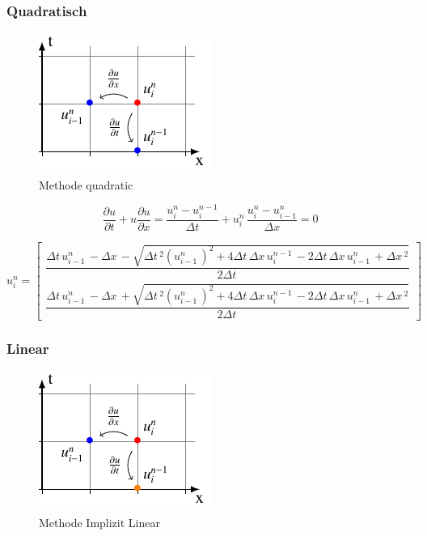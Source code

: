 \subsubsection{Quadratisch}
     \begin{figure}[!ht]
	\centering
	\includegraphics[height=.4\textwidth]{papers/burgers/BurgersEquation/tikz/quadratic/quadratic.pdf}
	\caption{Methode quadratic}
	\label{burgers:fig:quadratic}
\end{figure}

\begin{equation}
\frac {\partial u}{\partial t}+u{\frac {\partial u}{\partial x}} = \frac{u_{i}^{n}-u_{i}^{n-1}}{\Delta t}+ u_{i}^{n}\, \frac{u_{i}^{n}-u_{i-1}^{n}}{\Delta x}=0
\end{equation}

\begin{equation}
  u_{i}^{n} = \begin{bmatrix}
     \dfrac{\Delta{t}\, u^{n}_{i-1}\, - \Delta{x}\, - \sqrt{\Delta{t}\,^{2} \left(u^{n}_{i-1}\,\right)^{2} + 4 \Delta{t}\, \Delta{x}\, u^{n-1}_{i}\, - 2 \Delta{t}\, \Delta{x}\, u^{n}_{i-1}\, + \Delta{x}\,^{2}}}{2 \Delta{t}\,} \\[15pt]
     \dfrac{\Delta{t}\, u^{n}_{i-1}\, - \Delta{x}\, + \sqrt{\Delta{t}\,^{2} \left(u^{n}_{i-1}\,\right)^{2} + 4 \Delta{t}\, \Delta{x}\, u^{n-1}_{i}\, - 2 \Delta{t}\, \Delta{x}\, u^{n}_{i-1}\, + \Delta{x}\,^{2}}}{2 \Delta{t}\,}
  \end{bmatrix}
\end{equation}

\subsubsection{Linear}
     \begin{figure}[!ht]
	\centering
	\includegraphics[height=.4\textwidth]{papers/burgers/BurgersEquation/tikz/linear5/linear5.pdf}
	\caption{Methode Implizit Linear}
	\label{burgers:fig:linear5}
	\end{figure}
	
